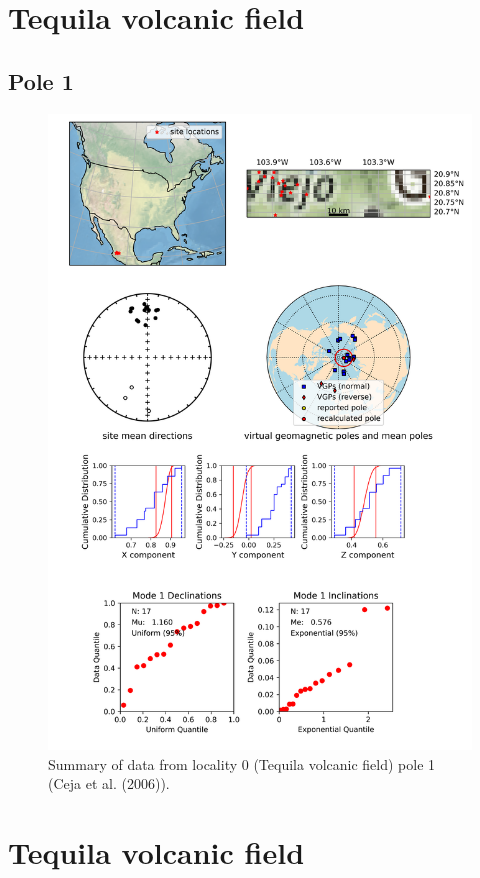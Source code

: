 
\section{Tequila volcanic field}
\subsection{Pole 1}


\begin{figure}[H]
\centering
\includegraphics[width=5 in]{./0/1/pole_summary.png}
\caption{Summary of data from locality 0 (Tequila volcanic field) pole 1 (Ceja et al. (2006)).}
\end{figure}

\section{Tequila volcanic field}
